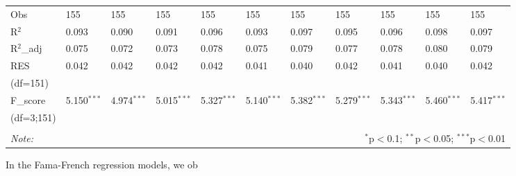 \begin{table}[H]
\begin{tabularx}{\textwidth}{XXXXXXXXXXl}
Obs & 155 & 155 & 155 & 155 & 155 & 155 & 155 & 155 & 155 & 155 \\ 
R$^{2}$ & 0.093 & 0.090 & 0.091 & 0.096 & 0.093 & 0.097 & 0.095 & 0.096 & 0.098 & 0.097 \\ 
R$^{2}$_{adj} & 0.075 & 0.072 & 0.073 & 0.078 & 0.075 & 0.079 & 0.077 & 0.078 & 0.080 & 0.079 \\ 
RES & 0.042 & 0.042 & 0.042 & 0.042 & 0.041 & 0.040 & 0.042 & 0.041 & 0.040 & 0.042 \\ 
(df=151) & & & & & & & & & & \\
F_{score} & 5.150$^{***}$ & 4.974$^{***}$ & 5.015$^{***}$ & 5.327$^{***}$ & 5.140$^{***}$ & 5.382$^{***}$ & 5.279$^{***}$ & 5.343$^{***}$ & 5.460$^{***}$ & 5.417$^{***}$ \\
(df=3;151) & & & & & & & & & & \\
\hline 
\hline \\[-2ex] 
\textit{Note:}  & \multicolumn{10}{r}{$^{*}$p$<$0.1; $^{**}$p$<$0.05; $^{***}$p$<$0.01} \\ 
\end{tabularx} 
\end{table} 

In the Fama-French regression models, we ob

